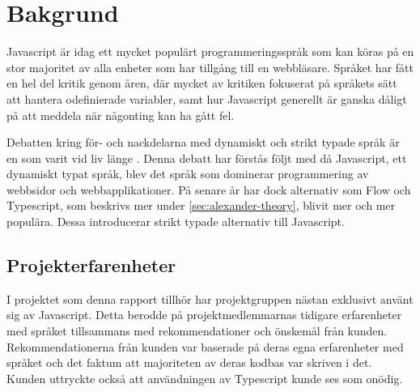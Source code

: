 \section{Bakgrund}
\label{sec:alexander-background}

Javascript är idag ett mycket populärt programmeringsspråk som kan köras på en stor majoritet av alla enheter som har tillgång till en webbläsare. Språket har fått en hel del kritik genom åren, där mycket av kritiken fokuserat på språkets sätt att hantera odefinierade variabler, samt hur Javascript generellt är ganska dåligt på att meddela när någonting kan ha gått fel.

Debatten kring för- och nackdelarna med dynamiskt och strikt typade språk är en som varit vid liv länge \cite{old-type-debate}. Denna debatt har förstås följt med då Javascript, ett dynamiskt typat språk, blev det språk som dominerar programmering av webbsidor och webbapplikationer. På senare år har dock alternativ som Flow och Typescript, som beskrivs mer under \ref{sec:alexander-theory}, blivit mer och mer populära. Dessa introducerar strikt typade alternativ till Javascript.

\subsection{Projekterfarenheter}
I projektet som denna rapport tillhör har projektgruppen nästan exklusivt använt sig av Javascript. Detta berodde på projektmedlemmarnas tidigare erfarenheter med språket tillsammans med rekommendationer och önskemål från kunden. Rekommendationerna från kunden var baserade på deras egna erfarenheter med språket och det faktum att majoriteten av deras kodbas var skriven i det. Kunden uttryckte också att användningen av Typescript kunde ses som onödig.